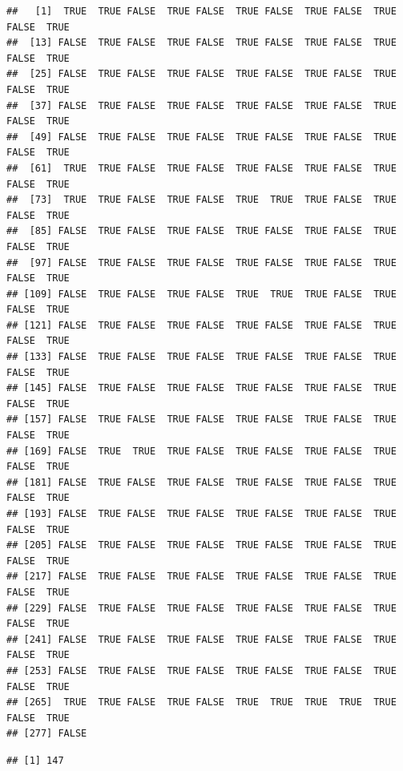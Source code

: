 \documentclass[]{article}
\newenvironment{Shaded}{\begin{snugshade}}{\end{snugshade}}
\newcommand{\KeywordTok}[1]{\textcolor[rgb]{0.13,0.29,0.53}{\textbf{#1}}}
\newcommand{\NormalTok}[1]{#1}
\newcommand{\OperatorTok}[1]{\textcolor[rgb]{0.81,0.36,0.00}{\textbf{#1}}}
\newcommand{\StringTok}[1]{\textcolor[rgb]{0.31,0.60,0.02}{#1}}
\begin{document}
\begin{verbatim}
##   [1]  TRUE  TRUE FALSE  TRUE FALSE  TRUE FALSE  TRUE FALSE  TRUE FALSE  TRUE
##  [13] FALSE  TRUE FALSE  TRUE FALSE  TRUE FALSE  TRUE FALSE  TRUE FALSE  TRUE
##  [25] FALSE  TRUE FALSE  TRUE FALSE  TRUE FALSE  TRUE FALSE  TRUE FALSE  TRUE
##  [37] FALSE  TRUE FALSE  TRUE FALSE  TRUE FALSE  TRUE FALSE  TRUE FALSE  TRUE
##  [49] FALSE  TRUE FALSE  TRUE FALSE  TRUE FALSE  TRUE FALSE  TRUE FALSE  TRUE
##  [61]  TRUE  TRUE FALSE  TRUE FALSE  TRUE FALSE  TRUE FALSE  TRUE FALSE  TRUE
##  [73]  TRUE  TRUE FALSE  TRUE FALSE  TRUE  TRUE  TRUE FALSE  TRUE FALSE  TRUE
##  [85] FALSE  TRUE FALSE  TRUE FALSE  TRUE FALSE  TRUE FALSE  TRUE FALSE  TRUE
##  [97] FALSE  TRUE FALSE  TRUE FALSE  TRUE FALSE  TRUE FALSE  TRUE FALSE  TRUE
## [109] FALSE  TRUE FALSE  TRUE FALSE  TRUE  TRUE  TRUE FALSE  TRUE FALSE  TRUE
## [121] FALSE  TRUE FALSE  TRUE FALSE  TRUE FALSE  TRUE FALSE  TRUE FALSE  TRUE
## [133] FALSE  TRUE FALSE  TRUE FALSE  TRUE FALSE  TRUE FALSE  TRUE FALSE  TRUE
## [145] FALSE  TRUE FALSE  TRUE FALSE  TRUE FALSE  TRUE FALSE  TRUE FALSE  TRUE
## [157] FALSE  TRUE FALSE  TRUE FALSE  TRUE FALSE  TRUE FALSE  TRUE FALSE  TRUE
## [169] FALSE  TRUE  TRUE  TRUE FALSE  TRUE FALSE  TRUE FALSE  TRUE FALSE  TRUE
## [181] FALSE  TRUE FALSE  TRUE FALSE  TRUE FALSE  TRUE FALSE  TRUE FALSE  TRUE
## [193] FALSE  TRUE FALSE  TRUE FALSE  TRUE FALSE  TRUE FALSE  TRUE FALSE  TRUE
## [205] FALSE  TRUE FALSE  TRUE FALSE  TRUE FALSE  TRUE FALSE  TRUE FALSE  TRUE
## [217] FALSE  TRUE FALSE  TRUE FALSE  TRUE FALSE  TRUE FALSE  TRUE FALSE  TRUE
## [229] FALSE  TRUE FALSE  TRUE FALSE  TRUE FALSE  TRUE FALSE  TRUE FALSE  TRUE
## [241] FALSE  TRUE FALSE  TRUE FALSE  TRUE FALSE  TRUE FALSE  TRUE FALSE  TRUE
## [253] FALSE  TRUE FALSE  TRUE FALSE  TRUE FALSE  TRUE FALSE  TRUE FALSE  TRUE
## [265]  TRUE  TRUE FALSE  TRUE FALSE  TRUE  TRUE  TRUE  TRUE  TRUE FALSE  TRUE
## [277] FALSE
\end{verbatim}

\begin{Shaded}
\end{Shaded}

\begin{verbatim}
## [1] 147
\end{verbatim}
\end{document}
